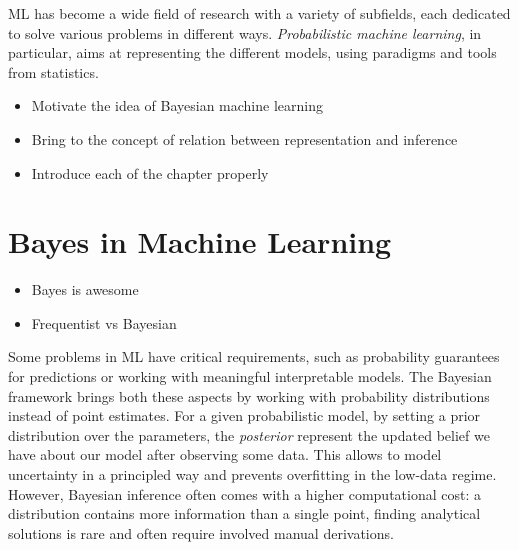 

\ifpdf
    \graphicspath{{chapters/1_introduction/figures/}}
\else
    \graphicspath{{1_introduction/figures/EPS/}{1_introduction/figures/}}
\fi


\ac{ML} has become a wide field of research with a variety of subfields, each dedicated to solve various problems in different ways.
\textit{Probabilistic machine learning}, in particular, aims at representing the different models, using paradigms and tools from statistics.

\begin{itemize}
    \item Motivate the idea of Bayesian machine learning
    \item Bring to the concept of relation between representation and inference
    \item Introduce each of the chapter properly
\end{itemize}


\section{Bayes in Machine Learning}

\begin{itemize}
    \item Bayes is awesome
    \item Frequentist vs Bayesian
\end{itemize}

Some problems in \ac{ML} have critical requirements, such as probability guarantees for predictions or working with meaningful interpretable models.
The Bayesian framework brings both these aspects by working with probability distributions instead of point estimates.
For a given probabilistic model, by setting a prior distribution over the parameters, the \textit{posterior} represent the updated belief we have about our model after observing some data.
This allows to model uncertainty in a principled way and prevents overfitting in the low-data regime.
However, Bayesian inference often comes with a higher computational cost: a distribution contains more information than a single point, finding analytical solutions is rare and often require involved manual derivations.

